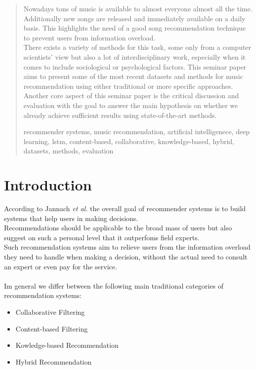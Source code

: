 \documentclass[runningheads,a4paper]{llncs}
\newcommand{\keywords}[1]{\par\addvspace\baselineskip
\noindent\keywordname\enspace\ignorespaces#1}
\begin{document}
\maketitle
\begin{abstract}
  Nowadays tons of music is available to almost everyone almost all the time. Additionally new songs are released and immediately available on a daily basis. 
  This highlights the need of a good song recommendation technique to prevent users from information overload. \\
  There exists a variety of methods for this task, some only from a computer scientists’ view but also a lot of interdisciplinary work, especially when it comes to include sociological or psychological factors. 
  This seminar paper aims to present some of the most recent datasets and methods for music recommendation using either traditional or more specific approaches. 
  Another core aspect of this seminar paper is the critical discussion and evaluation with the goal to answer the main hypothesis on whether we already achieve sufficient results using state-of-the-art methods. 
  

\keywords{recommender systems, music recommendation, artificial intelligenece, deep learning, lstm, content-based, collaborative, knowledge-based, hybrid, datasets, methods, evaluation}
\end{abstract}

\section{Introduction}
According to Jannach \textit{et al.} \cite{jannach2010recommender}
 the overall goal of recommender systems is to build systems that help users in making decisions.\\
Recommendations should be applicable to the broad mass of users but also suggest on such a personal level that it outperfoms field experts. 
\\
Such recommendation systems aim to relieve users from the information overload they need to handle when 
making a decision, without the actual need to consult an expert or even pay for the service.\\ 
\\
Im general we differ between the following main traditional categories of recommendation systems: 
\begin{itemize}
  \item Collaborative Filtering
  \item Content-based Filtering
  \item Kowledge-based Recommendation
  \item Hybrid Recommendation
\end{itemize}
\end{document}
